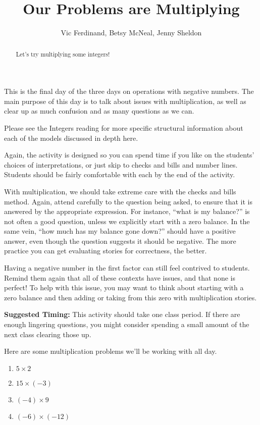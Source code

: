 \documentclass{ximera}
\title{Our Problems are Multiplying}
\author{Vic Ferdinand, Betsy McNeal, Jenny Sheldon}
\begin{document}
\begin{abstract}
    Let's try multiplying some integers!
\end{abstract}
\maketitle

\begin{instructorIntro}
This is the final day of the three days on operations with negative numbers.  The main purpose of this day is to talk about issues with multiplication, as well as clear up as much confusion and as many questions as we can.

Please see the Integers reading for more specific structural information about each of the models discussed in depth here.

Again, the activity is designed so you can spend time if you like on the students' choices of interpretations, or just skip to checks and bills and number lines.  Students should be fairly comfortable with each by the end of the activity.

With multiplication, we should take extreme care with the checks and bills method.  Again, attend carefully to the question being asked, to ensure that it is answered by the appropriate expression.  For instance, ``what is my balance?'' is not often a good question, unless we explicitly start with a zero balance.  In the same vein, ``how much has my balance gone down?'' should have a positive answer, even though the question suggests it should be negative.  The more practice you can get evaluating stories for correctness, the better.

Having a negative number in the first factor can still feel contrived to students.  Remind them again that all of these contexts have issues, and that none is perfect!  To help with this issue, you may want to think about starting with a zero balance and then adding or taking from this zero with multiplication stories.  

{\bf Suggested Timing:} This activity should take one class period.  If there are enough lingering questions, you might consider spending a small amount of the next class clearing those up.
\end{instructorIntro}

Here are some multiplication problems we'll be working with all day.

\begin{enumerate}
    \item $5 \times 2$
    \item $15 \times (-3)$
    \item $(-4) \times 9$
    \item $(-6) \times (-12)$
\end{enumerate}
\end{document}
